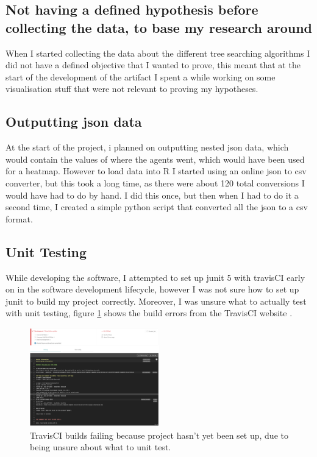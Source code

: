\documentclass[journal]{IEEEtran}
\begin{document}
		\subsection{Not having a defined hypothesis before collecting the data, to base my research around}

			When I started collecting the data about the different tree searching algorithms I did not have a defined objective that I wanted to prove, this meant that at the start of the development of the artifact I spent a while working on some visualisation stuff that were not relevant to proving my hypotheses.

		\subsection{Outputting json data}
			At the start of the project, i planned on outputting nested json data, which would contain the values of where the agents went, which would have been used for a heatmap. However to load data into R I started using an online json to csv converter, but this took a long time, as there were about 120 total conversions I would have had to do by hand. I did this once, but then when I had to do it a second time, I created a simple python script that converted all the json to a csv format.

	\subsection{Unit Testing}
		While developing the software, I attempted to set up junit 5 with travisCI early on in the software development lifecycle, however I was not sure how to set up junit to build my project correctly. Moreover, I was unsure what to actually test with unit testing, figure \ref{fig:TravisCI} shows the build errors from the TravisCI website \cite{TravisCI}.
		\begin{figure}[h]
		    \centering
		    \includegraphics[width=0.5\textwidth]{TravisCI}
		    \caption{ TravisCI builds failing because project hasn't yet been set up, due to being unsure about what to unit test. }
		    \label{fig:TravisCI}
		\end{figure}
\end{document}
